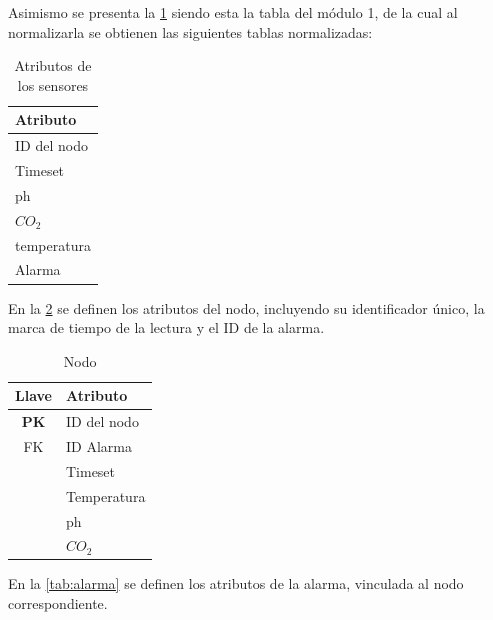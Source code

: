Asimismo se presenta la \cref{tab:lecturas_kefir} siendo esta la tabla
del módulo 1, de la cual al normalizarla se obtienen las siguientes tablas normalizadas:

\begin{table}[H]
    \centering
    \caption{Atributos de los sensores}
    \label{tab:lecturas_kefir}
    \begin{tabular}{|>{\raggedright\arraybackslash}p{2.5cm}|}        
        \hline
        \textbf{Atributo}         \\ \hline
        ID del nodo               \\ \hline
        Timeset                   \\ \hline
        ph                        \\ \hline
        $CO_{2}$                  \\ \hline
        temperatura               \\ \hline
        Alarma                    \\ \hline
    \end{tabular}
\end{table}

En la \cref{tab:Nodo} se definen los atributos del nodo, incluyendo su identificador único, la
marca de tiempo de la lectura y el ID de la alarma.


\begin{table}[H]
    \centering
    \caption{Nodo}
    \label{tab:Nodo}
    \small
   \begin{tabular}{|c|>{\raggedright\arraybackslash}p{2.5cm}|}
        \hline
        \textbf{Llave}         & \textbf{Atributo}    \\ \hline
        \textbf{PK}  & ID del nodo                        \\ \hline
        FK & ID Alarma                                     \\ \hline
        & Timeset                                      \\ \hline
        & Temperatura                \\ \hline
        & ph                         \\ \hline
        & $CO_{2}$                   \\ \hline

    \end{tabular}
\end{table}

En la \cref{tab:alarma} se definen los atributos de la alarma, vinculada al nodo
correspondiente.


